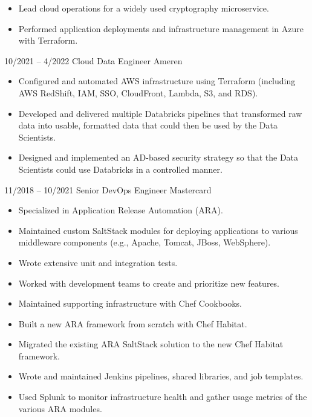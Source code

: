 \documentclass[9pt]{developercv} %
\begin{document}
\begin{entrylist}
{\begin{itemize}[noitemsep,topsep=0pt,parsep=0pt,partopsep=0pt, leftmargin=-1pt]
	    \item Lead cloud operations for a widely used cryptography microservice.
	    \item Performed application deployments and infrastructure management in Azure with Terraform.
	\end{itemize}}
	\entry
		{10/2021 -- 4/2022}
		{Cloud Data Engineer}
		{Ameren}
		{\vspace{-10pt}
        \begin{itemize}[noitemsep,topsep=0pt,parsep=0pt,partopsep=0pt, leftmargin=-1pt]
            \item Configured and automated AWS infrastructure using Terraform (including AWS RedShift, IAM, SSO,
		  CloudFront, Lambda, S3, and RDS).
            \item Developed and delivered multiple Databricks pipelines that transformed raw data into usable, formatted
		  data that could then be used by the Data Scientists.
	    \item Designed and implemented an AD-based security strategy so that the Data Scientists could use Databricks
		  in a controlled manner.
	\end{itemize}}
	\entry
		{11/2018 -- 10/2021}
		{Senior DevOps Engineer}
		{Mastercard}
		{\vspace{-10pt}
        \begin{itemize}[noitemsep,topsep=0pt,parsep=0pt,partopsep=0pt, leftmargin=-1pt]
            \item Specialized in Application Release Automation (ARA).
            \item Maintained custom SaltStack modules for deploying applications to various middleware components (e.g.,
		  Apache, Tomcat, JBoss, WebSphere).
	    \item Wrote extensive unit and integration tests.
	    \item Worked with development teams to create and prioritize new features.
	    \item Maintained supporting infrastructure with Chef Cookbooks.
	    \item Built a new ARA framework from scratch with Chef Habitat.
	    \item Migrated the existing ARA SaltStack solution to the new Chef Habitat framework.
	    \item Wrote and maintained Jenkins pipelines, shared libraries, and job templates.
	    \item Used Splunk to monitor infrastructure health and gather usage metrics of the various ARA modules.

\end{itemize}}
\end{entrylist}
\end{document}
